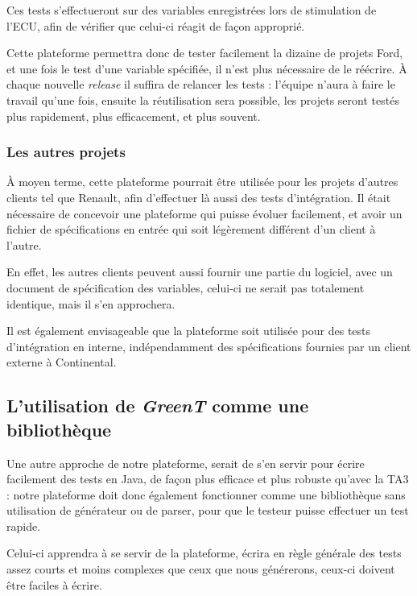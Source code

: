 	Ces tests s'effectueront sur des variables enregistrées lors de stimulation de l'ECU, afin de vérifier que celui-ci réagit de façon approprié.

	Cette plateforme permettra donc de tester facilement la dizaine de projets Ford, et une fois le test d'une variable spécifiée, il n'est plus nécessaire de le réécrire. À chaque nouvelle \textit{release} il suffira de relancer les tests : l'équipe n'aura à faire le travail qu'une fois, ensuite la réutilisation sera possible, les projets seront testés plus rapidement, plus efficacement, et plus souvent.

	\subsubsection{Les autres projets}
	À moyen terme, cette plateforme pourrait être utilisée pour les projets d'autres clients tel que Renault, afin d'effectuer là aussi des tests d'intégration. Il était nécessaire de concevoir une plateforme qui puisse évoluer facilement, et avoir un fichier de spécifications en entrée qui soit légèrement différent d'un client à l'autre.

	En effet, les autres clients peuvent aussi fournir une partie du logiciel, avec un document de spécification des variables, celui-ci ne serait pas totalement identique, mais il s'en approchera.

	Il est également envisageable que la plateforme soit utilisée pour des tests d'intégration en interne, indépendamment des spécifications fournies par un client externe à Continental.
	\newpage
	\subsection{L'utilisation de \textit{GreenT} comme une bibliothèque}
	Une autre approche de notre plateforme, serait de s'en servir pour écrire facilement des tests en Java, de façon plus efficace et plus robuste qu'avec la TA3 : notre plateforme doit donc également fonctionner comme une bibliothèque sans utilisation de générateur ou de parser, pour que le testeur puisse effectuer un test rapide. 

	Celui-ci apprendra à se servir de la plateforme, écrira en règle générale des tests assez courts et moins complexes que ceux que nous générerons, ceux-ci doivent être faciles à écrire.

